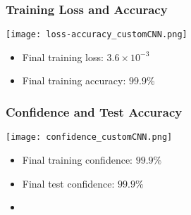 \documentclass[../presentation.tex]{subfiles} %
\begin{document}
\begin{frame}
    
    \frametitle{Training Loss and Accuracy}

    \begin{center}
        \texttt{[image: loss-accuracy\_customCNN.png]}
    \end{center}

    \small{
    \begin{cbox}
        \begin{itemize}
            \item Final training loss: $3.6\times10^{-3}$
            \item Final training accuracy: $99.9\%$
        \end{itemize}
    \end{cbox}
    }

\end{frame}

\begin{frame}
    
    \frametitle{Confidence and Test Accuracy}

    \begin{center}
        \texttt{[image: confidence\_customCNN.png]}
    \end{center}

    \small{
    \begin{cbox}
        \begin{itemize}
            \item Final training confidence: $99.9\%$
            \item Final test confidence: $99.9\%$
            \item {}
        \end{itemize}
    \end{cbox}
    }

\end{frame}
\end{document}
